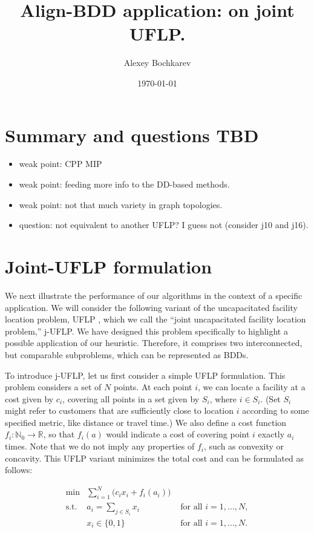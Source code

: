 \documentclass[11pt]{article}
\author{Alexey Bochkarev}
\date{\today}
\title{Align-BDD application: on joint UFLP.}
\begin{document}
\maketitle
\section{Summary and questions TBD}
\label{sec:org27bdc3e}
\begin{itemize}
\item weak point: CPP MIP
\item weak point: feeding more info to the DD-based methods.
\item weak point: not that much variety in graph topologies.
\item question: not equivalent to another UFLP? I guess not (consider j10 and j16).
\end{itemize}

\section{Joint-UFLP formulation}
\label{sec:jUFLP}
We next illustrate the performance of our algorithms in the context of a
specific application. We will consider the following variant of the
uncapacitated facility location problem, UFLP \citep{owen1998,revelle2008}, which
we call the ``joint uncapacitated facility location problem,'' j-UFLP. We have
designed this problem specifically to highlight a possible application of our
heuristic. Therefore, it comprises two interconnected, but comparable
subproblems, which can be represented as BDDs.

To introduce j-UFLP, let us first consider a simple UFLP formulation. This
problem considers a set of \(N\) points. At each point \(i\), we can locate a
facility at a cost given by \(c_i\), covering all points in a set given by \(S_i\),
where \(i \in S_i\). (Set \(S_i\) might refer to customers that are sufficiently
close to location \(i\) according to some specified metric, like distance or
travel time.) We also define a cost function \(f_i:
\mathbb{N}_0\rightarrow\mathbb{R}\), so that \(f_i(a)\) would indicate a cost of
covering point \(i\) exactly \(a_i\) times. Note that we do not imply any properties
of \(f_i\), such as convexity or concavity. This UFLP variant minimizes the total
cost and can be formulated as follows:

\begin{subequations}\label{eq:UFLP}
\begin{align}
  \min & \sum_{i=1}^N \Big(c_i x_i + f_i(a_i)\Big)&\\
    \textrm{s.t. } & a_i = \sum_{j\in S_i} x_i& \textrm{ for all } i=1,\ldots, N,\\
    & x_i\in\{0,1\} & \textrm{ for all } i=1,\ldots,N.
\end{align}
\end{subequations}
\end{document}
